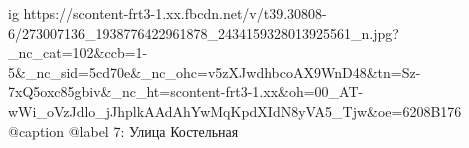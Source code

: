  
 
 
 
 

\ifcmt
  ig https://scontent-frt3-1.xx.fbcdn.net/v/t39.30808-6/273007136_1938776422961878_2434159328013925561_n.jpg?_nc_cat=102&ccb=1-5&_nc_sid=5cd70e&_nc_ohc=v5zXJwdhbcoAX9WnD48&tn=Sz-7xQ5oxc85gbiv&_nc_ht=scontent-frt3-1.xx&oh=00_AT-wWi_oVzJdlo_jJhplkAAdAhYwMqKpdXIdN8yVA5_Tjw&oe=6208B176
  @caption @label 7: Улица Костельная
\fi
